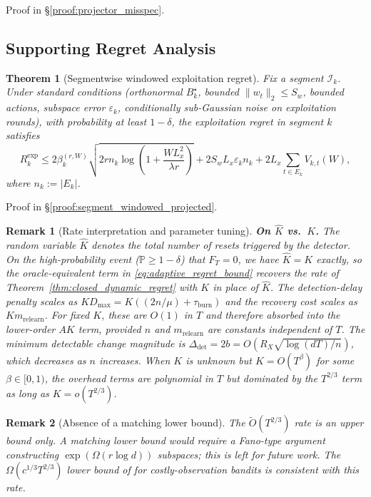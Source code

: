 \documentclass{article}
\newcommand{\Prob}{\mathbb{P}}
\newcommand{\cI}{\mathcal{I}}
\newtheorem{theorem}{Theorem}
\newtheorem{remark}{Remark}
\begin{document}
Proof in \S\ref{proof:projector_misspec}.

\subsection{Supporting Regret Analysis}
\label{app:supporting_regret}

\begin{theorem}[Segmentwise windowed exploitation regret]
\label{thm:segment_windowed_projected}
Fix a segment $\cI_k$. Under standard conditions (orthonormal $B_k^\star$, bounded $\|w_t\|_2 \le S_w$, bounded actions, subspace error $\varepsilon_k$, conditionally sub-Gaussian noise on exploitation rounds), with probability at least $1-\delta$, the exploitation regret in segment $k$ satisfies
\[
R_k^{\mathrm{exp}} \le
2\beta_k^{(r,W)}
\sqrt{2r n_k \log\!\left(1+\frac{W L_x^2}{\lambda r}\right)}
+ 2S_wL_x \varepsilon_k n_k
+ 2L_x \sum_{t\in E_k} V_{k,t}(W),
\]
where $n_k:=|E_k|$.
\end{theorem}

Proof in \S\ref{proof:segment_windowed_projected}.

\begin{remark}[Rate interpretation and parameter tuning]
\label{rem:adaptive_rate_discussion}
\textbf{On $\hat K$ vs.\ $K$.}  The random variable $\hat K$ denotes the total number of resets triggered by the detector.  On the high-probability event ($\Prob \ge 1-\delta$) that $F_T = 0$, we have $\hat K = K$ exactly, so the oracle-equivalent term in \eqref{eq:adaptive_regret_bound} recovers the rate of Theorem~\ref{thm:closed_dynamic_regret} with $K$ in place of $\hat K$.  The detection-delay penalty scales as $K D_{\max} = K((2n/\mu) + \tau_{\mathrm{burn}})$ and the recovery cost scales as $K m_{\mathrm{relearn}}$.  For fixed $K$, these are $O(1)$ in $T$ and therefore absorbed into the lower-order $AK$ term, provided $n$ and $m_{\mathrm{relearn}}$ are constants independent of $T$.  The minimum detectable change magnitude is $\Delta_{\mathrm{det}} = 2b = O(R_X\sqrt{\log(dT)/n})$, which decreases as $n$ increases.  When $K$ is unknown but $K = O(T^\beta)$ for some $\beta \in [0, 1)$, the overhead terms are polynomial in $T$ but dominated by the $T^{2/3}$ term as long as $K = o(T^{2/3})$.
\end{remark}

\begin{remark}[Absence of a matching lower bound]
\label{rem:lower_bound}
The $\widetilde O(T^{2/3})$ rate is an upper bound only.
A matching lower bound would require a Fano-type argument constructing $\exp(\Omega(r\log d))$ subspaces; this is left for future work.
The $\Omega(c^{1/3}T^{2/3})$ lower bound of \citet{tucker2023costly} for costly-observation bandits is consistent with this rate.
\end{remark}
\end{document}
